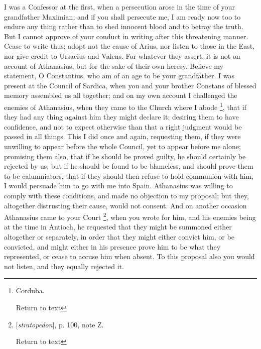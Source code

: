 I was a Confessor at the first, when a
persecution arose in the time of your grandfather Maximian; and if you
shall persecute me, I am ready now too to endure any thing rather than
to shed innocent blood and to betray the truth. But I cannot approve
of your conduct in writing after this threatening manner. Cease to
write thus; adopt not the cause of Arius, nor listen to those in the
East, nor give credit to Ursacius and Valens. For whatever they
assert, it is not on account of Athanasius, but for the sake of their
own heresy. Believe my statement, O Constantius, who am of an age to
be your grandfather. I was present at the Council of Sardica,
when you and your brother Constans of blessed memory assembled us all
together; and on my own account I challenged the enemies of
Athanasius, when they came to the Church where I abode \footnote{Corduba.

Return to text}, that if they had any thing against him they might declare it;
desiring them to have confidence, and not to expect otherwise than
that a right judgment would be passed in all things. This I did once
and again, requesting them, if they were unwilling to appear before
the whole Council, yet to appear before me alone; promising them also,
that if he should be proved guilty, he should certainly be rejected by
us; but if he should be found to be blameless, and should prove them
to be calumniators, that if they should then refuse to hold communion
with him, I would persuade him to go with me into Spain. Athanasius
was willing to comply with these conditions, and made no objection to
my proposal; but they, altogether distrusting their cause, would not
consent. And on another occasion Athanasius came to your Court \footnote{[\emph{stratopedon}], p. 100, note Z.

Return to text}, when you wrote for him, and his enemies being at the time in
Antioch, he requested that they might be summoned either altogether or
separately, in order that they might either convict him, or be
convicted, and might either in his presence prove him to be what they
represented, or cease to accuse him when absent. To this proposal also
you would not listen, and they equally rejected it.

